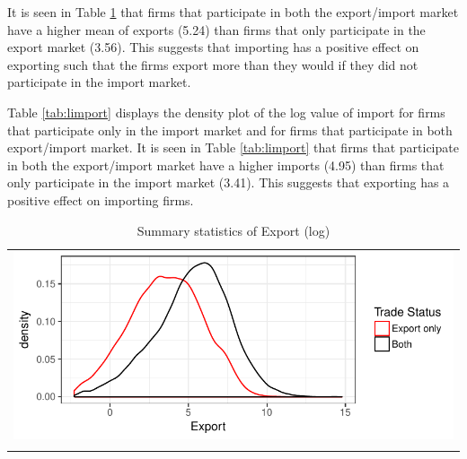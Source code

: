 \documentclass[11pt]{article}
\begin{document}
It is seen in Table \ref{tab:lexport} that firms that participate in both the
export/import market have a higher mean of exports (5.24) than firms that only
participate in the export market (3.56). This suggests that importing has a
positive effect on exporting such that the firms export more than they
would if they did not participate in the import market.     

Table \ref{tab:limport} displays the density plot of the log value of  import  for firms that participate only in the
import market and for firms that participate in both export/import
market. 
It is seen in Table \ref{tab:limport} that firms that participate in both the
export/import market have a higher imports (4.95) than firms that only
participate in the import market (3.41). This suggests that exporting has a
positive effect on importing firms. 

\begin{center}
\begin{table}[H]
\caption{Summary statistics of Export (log)}
\label{tab:lexport}
\begin{tabular}{c}
 \includegraphics{./PICS/denslexport.pdf}   \\ 
   \\  
\end{tabular}
\end{table}
\end{center}
\end{document}
